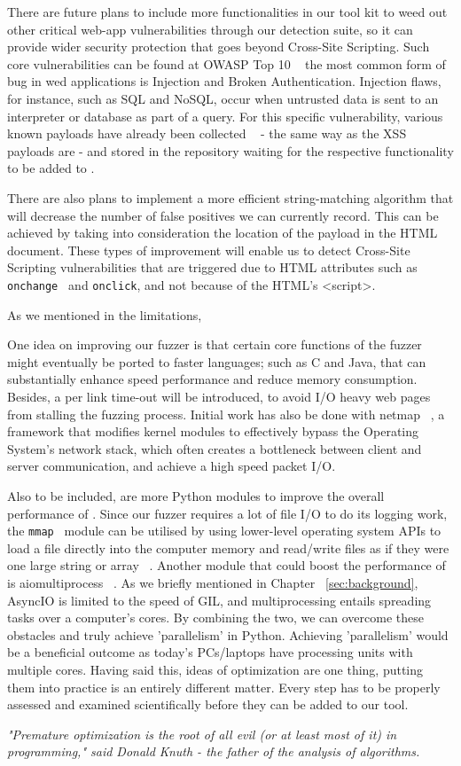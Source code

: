 There are future plans to include more functionalities in our tool kit to weed out other critical web-app vulnerabilities through our detection suite, so it can provide wider security protection that goes beyond Cross-Site Scripting. Such core vulnerabilities can be found at OWASP Top 10 ~\cite{owasp2017} the most common form of bug in wed applications is Injection and Broken Authentication. Injection flaws, for instance, such as SQL and NoSQL, occur when untrusted data is sent to an interpreter or database as part of a query. For this specific vulnerability, various known payloads have already been collected ~\cite{seclist} - the same way as the XSS payloads are - and stored in the repository waiting for the respective functionality to be added to \pname{}.

There are also plans to implement a more efficient string-matching algorithm that will decrease the number of false positives we can currently record. This can be achieved by taking into consideration the location of the payload in the HTML document. These types of improvement will enable us to detect Cross-Site Scripting vulnerabilities that are triggered due to HTML attributes such as {\tt onchange } and {\tt onclick}, and not because of the HTML's <script>.

As we mentioned in the limitations, 

One idea on improving our fuzzer is that certain core functions of the
fuzzer might eventually be ported to faster languages; such as C and Java, that can substantially enhance speed performance and reduce memory consumption. Besides, a per link time-out will be introduced, to avoid I/O heavy web pages from stalling the fuzzing process. Initial work has also be done with netmap  ~\cite{rizzo2011Netmap}, a framework that modifies kernel modules to effectively bypass the Operating System's network stack, which often creates a bottleneck between client and server communication, and achieve a high speed packet I/O.

Also to be included, are more Python modules to improve the overall performance of \pname{}. Since our fuzzer requires a lot of file I/O to do its logging work, the {\tt mmap } module can be utilised by using lower-level operating system APIs to load a file directly into the computer memory and read/write files as if they were one large string or array ~\cite{mmap}. Another module that could boost the performance of \pname{} is aiomultiprocess ~\cite{aiomultiprocess}. As we briefly mentioned in Chapter ~\ref{sec:background}, AsyncIO is limited to the speed of GIL, and multiprocessing entails spreading tasks over a computer's cores. By combining the two, we can overcome these obstacles and truly achieve 'parallelism' in Python. Achieving 'parallelism' would be a beneficial outcome as today's PCs/laptops have processing units with multiple cores.
Having said this, ideas of optimization are one thing, putting them into practice is an entirely different matter. Every step has to be properly assessed and examined scientifically before they can be added to our tool.

\textit{"Premature optimization is the root of all evil (or at least most of it) in programming," said Donald Knuth - the father of the analysis of algorithms.}